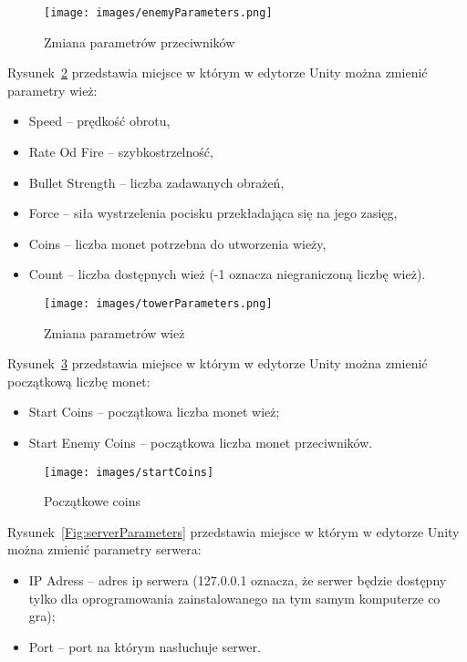 \begin{figure}
\texttt{[image: images/enemyParameters.png]}
\caption{Zmiana parametrów przeciwników}
\label{Fig:enemyParameters}
\end{figure}  

Rysunek~\ref{Fig:towerParameters}  przedstawia miejsce w którym w edytorze Unity można zmienić parametry wież:
\begin{itemize}
\item Speed -- prędkość obrotu,
\item Rate Od Fire -- szybkostrzelność,
\item Bullet Strength -- liczba zadawanych obrażeń,
\item Force -- siła wystrzelenia pocisku przekładająca się na jego zasięg,
\item Coins -- liczba monet potrzebna do utworzenia wieży,
\item Count -- liczba dostępnych wież (-1 oznacza niegraniczoną liczbę wież).  
\end{itemize}

\begin{figure}
\texttt{[image: images/towerParameters.png]}
\caption{Zmiana parametrów wież}
\label{Fig:towerParameters}
\end{figure}  

Rysunek~\ref{Fig:startCoins}  przedstawia miejsce w którym w edytorze Unity można zmienić początkową liczbę monet:
\begin{itemize}
\item Start Coins --  początkowa liczba monet wież; 
\item Start Enemy Coins --  początkowa liczba monet przeciwników. 
\end{itemize}


\begin{figure}
\texttt{[image: images/startCoins]}
\caption{Początkowe coins}
\label{Fig:startCoins}
\end{figure} 

Rysunek~\ref{Fig:serverParameters}  przedstawia miejsce w którym w edytorze Unity można zmienić parametry serwera: 
\begin{itemize}
\item IP Adress --  adres ip serwera (127.0.0.1 oznacza, że serwer będzie dostępny tylko dla oprogramowania zainstalowanego na tym samym komputerze co gra); 
\item Port --  port na którym nasłuchuje serwer. 
\end{itemize}

